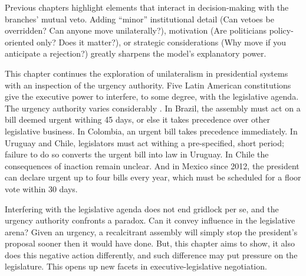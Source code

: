 \documentclass[letter,12pt]{article}
\begin{document}
Previous chapters highlight elements that interact in decision-making with the branches' mutual veto. Adding ``minor'' institutional detail (Can vetoes be overridden? Can anyone move unilaterally?), motivation (Are politicians policy-oriented only? Does it matter?), or strategic considerations (Why move if you anticipate a rejection?) greatly sharpens the model's explanatory power. 


This chapter continues the exploration of unilateralism in presidential systems with an inspection of the urgency authority. Five Latin American constitutions give the executive power to interfere, to some degree, with the legislative agenda. The urgency authority varies considerably \citep[][:437]{morgenstern.2002b}. In Brazil, the assembly must act on a bill deemed urgent withing 45 days, or else it takes precedence over other legislative business. In Colombia, an urgent bill takes precedence immediately. In Uruguay and Chile, legislators must act withing a pre-specified, short period; failure to do so converts the urgent bill into law in Uruguay. In Chile the consequences of inaction remain unclear. And in Mexico since 2012, the president can declare urgent up to four bills every year, which must be scheduled for a floor vote within 30 days. 

Interfering with the legislative agenda does not end gridlock per se, and the urgency authority confronts a paradox. Can it convey influence in the legislative arena? Given an urgency, a recalcitrant assembly will simply stop the president's proposal sooner then it would have done. But, this chapter aims to show, it also does this negative action differently, and such difference may put pressure on the legislature. This opens up new facets in executive-legislative negotiation. 
\end{document}
